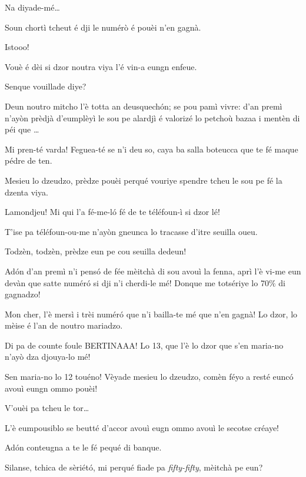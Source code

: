 \begin{drama}
\DzeudzoSenliquerspeaks Na diyade-mé\ldots

\Tobiespeaks Soun chortì tcheut é dji le numérò é pouèi n’en gagnà.

\DzeudzoSenliquerspeaks Istooo!

\Bertinaspeaks Vouè é dèi si dzor noutra viya l’é vin-a eungn enfeue.

\DzeudzoSenliquerspeaks Senque vouillade diye?

\Bertinaspeaks Deun noutro mitcho l’è totta an deusquechón; se pou pamì vivre: d'an premì n’ayòn prèdjà d'eumplèyì le sou pe alardjì é valorizé lo petchoù bazaa i mentèn di péi que \ldots

\Tobiespeaks Mi pren-té varda! Feguea-té se n’i deu so, caya ba salla boteucca que te fé maque pédre de ten.

\Bertinaspeaks Mesieu lo dzeudzo, prèdze pouèi perqué vouriye spen\-dre tcheu le sou pe fé la dzenta viya.

\Tobiespeaks Lamondjeu! Mi qui l'a fé-me-l\'o fé de te téléfoun-ì si dzor lé!

\Bertinaspeaks T'ise pa téléfoun-ou-me n’ayòn gneunca lo tracasse d’itre seu\-illa oueu.

\DzeudzoSenliquerspeaks {} To\-dzèn, to\-dzèn, prèdze eun pe cou seu\-illa dedeun!

\Tobiespeaks Adón d’an premì n’i pensó de fée mèitchà di sou avouì la fenna, aprì l’è vi-me eun devàn que satte numér\'o si dji n’i cherdi-le mé! Donque me totsériye lo 70$\%$ di gagnadzo!

\Bertinaspeaks Mon cher, l’è mersì i trèi numér\'o que n’i bailla-te mé que n’en gagnà! Lo dzor, lo mèise é l’an de noutro mariadzo.

\Tobiespeaks Di pa de counte foule BERTINAAA! Lo 13, que l’è lo dzor que s’en maria-no n’ayò dza djouya-lo mé!

\Bertinaspeaks Sen maria-no lo 12 touéno!  Vèyade mesieu lo dzeudzo, comèn féyo a resté eunc\'o avouì eungn ommo pouèi!

\DzeudzoSenliquerspeaks V'ouèi pa tcheu le tor\ldots

\Bertinaspeaks L’è eumpousiblo se beutté d’accor avouì eugn ommo avouì le secotse créaye!

\Tobiespeaks Adón conteugna a te le fé pequé di banque.

\DzeudzoSenliquerspeaks {} Silanse, tchica de sèriét\'o, mi perqué fiade pa \textit{fifty-fifty}, mèitchà pe eun?


\end{drama}
